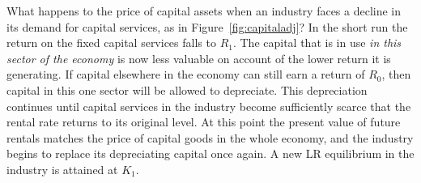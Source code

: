 What happens to the price of capital assets when an industry faces a decline in its demand for capital services, as in Figure~\ref{fig:capitaladj}? In the short run the return on the fixed capital services falls to $R_1$. The capital that is in use \textit{in this sector of the economy} is now less valuable on account of the lower return it is generating. If capital elsewhere in the economy can still earn a return of $R_0$, then capital in this one sector will be allowed to depreciate. This depreciation continues until capital services in the industry become sufficiently scarce that the rental rate returns to its original level. At this point the present value of future rentals matches the price of capital goods in the whole economy, and the industry begins to replace its depreciating capital once again. A new LR equilibrium in the industry is attained at $K_1$.
